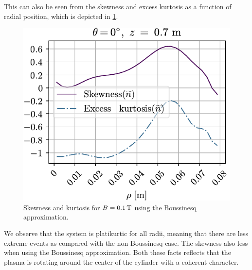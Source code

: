 This can also be seen from the skewness and excess kurtosis as a function of radial position, which is depicted in \cref{fig:skewKurt008B}.
%
\begin{figure}[htb]
    \centering
    \includegraphics{fig/results/compareBouss/skewKurt008B}
    \caption{Skewness and kurtosis for $B=0.1\, \text{T}$ using the Boussinesq approximation.}
    \label{fig:skewKurt008B}
\end{figure}
%
We observe that the system is platikurtic for all radii, meaning that there are less extreme events as compared with the non-Boussinesq case.
The skewness also less when using the Boussinesq approximation.
Both these facts reflects that the plasma is rotating around the center of the cylinder with a coherent character.

